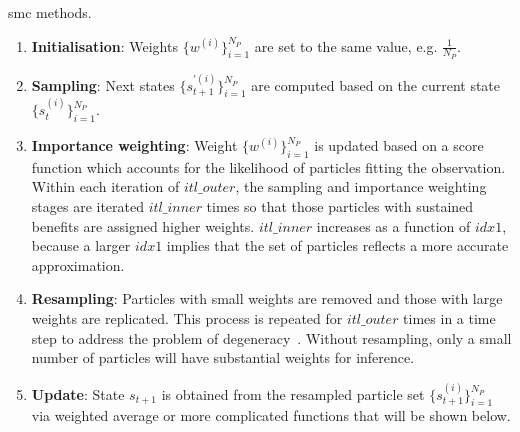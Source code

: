 \begin{algorithm}
\caption{\gls{smc} methods.}
\begin{algorithmic}[1]
			 \label{algo:s}
			 \label{algo:i}
		\ENDWHILE
	\ENDFOR
	\ENDIF
\ENDWHILE
{}
\ENDFOR
\end{algorithmic}
\label{algo:smc_bg}
\end{algorithm}

\begin{enumerate}
\item \textbf{Initialisation}: Weights $\{w^{(i)}\}^{N_P}_{i=1}$ are set to the same value, e.g. $\frac{1}{N_P}$.
\item \textbf{Sampling}: Next states $\{s_{t+1}^{'(i)}\}^{N_P}_{i=1}$ are computed based on the current state $\{s_{t}^{(i)}\}^{N_P}_{i=1}$.
\item \textbf{Importance weighting}: Weight $\{w^{(i)}\}^{N_P}_{i=1}$ is updated based on a score function which accounts for the likelihood of particles fitting the observation.
Within each iteration of $itl\_outer$, the sampling and importance weighting stages are iterated $itl\_inner$ times so that those particles with sustained benefits are assigned higher weights.
$itl\_inner$ increases as a function of $idx1$, because a larger $idx1$ implies that the set of particles reflects a more accurate approximation.
\item \textbf{Resampling}: Particles with small weights are removed and those with large weights are replicated.
This process is repeated for $itl\_outer$ times in a time step to address the problem of degeneracy~\cite{kitagawa96}.
Without resampling, only a small number of particles will have substantial weights for inference.
\item \textbf{Update}: State $s_{t+1}$ is obtained from the resampled particle set $\{s_{t+1}^{(i)}\}^{N_P}_{i=1}$ via weighted average or more complicated functions that will be shown below.
\end{enumerate}

